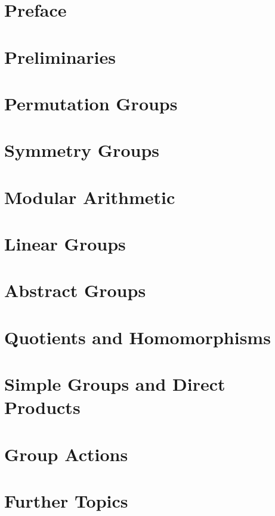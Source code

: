 \documentclass[11pt,oneside]{book}
\theoremstyle{definition}
\numberwithin{equation}{section}
\begin{document}
\newpage
\chapter{Preface}
  


\newpage
\mainmatter

\setcounter{chapter}{-1}
\chapter{Preliminaries}


\chapter{Permutation Groups}


\chapter{Symmetry Groups}

\newpage


\chapter{Modular Arithmetic}


\chapter{Linear Groups}


\chapter{Abstract Groups}

\newpage

\chapter{Quotients and Homomorphisms}

\newpage


\chapter{Simple Groups and Direct Products}

\newpage


\chapter{Group Actions}


\chapter{Further Topics}

\newpage

\newpage


\backmatter
\printindex  %
\end{document}
